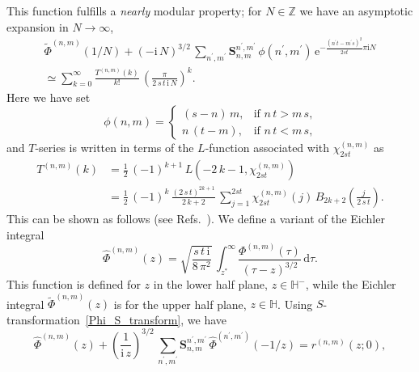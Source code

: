\documentclass[12pt,reqno]{amsart}
\begin{document}
This function  fulfills a \emph{nearly} modular property;
for $N \in \mathbb{Z}$ we have an asymptotic expansion in
$N\to \infty$,
\begin{multline}
  \label{nearly_modular_Phi}
  \widetilde{\Phi}^{(n,m)}(1/N)
  + ( - \mathrm{i} \, N)^{3/2} \,
  \sum_{n^\prime , m^\prime}
  \mathbf{S}_{n,m}^{n^\prime , m^\prime} \,
  \phi(n^\prime , m^\prime) \,
  \mathrm{e}^{
    - \frac{(n^\prime t - m^\prime s)^2}{2 s t} \pi \mathrm{i} N
  }
  \\
  \simeq
  \sum_{k=0}^\infty
  \frac{T^{(n,m)}(k)}{k!} \,
  \left(
    \frac{\pi}{2 \, s \, t \, \mathrm{i} \, N}
  \right)^k .
\end{multline}
Here we have set
\begin{equation}
  \phi(n,m)
  =
  \begin{cases}
    (s-n) \, m ,
    &
    \text{if  $n \,t > m \, s$,}
    \\[2mm]
%
    n \, (t-m) ,
    &
    \text{if  $n \, t < m \, s$,}
  \end{cases}
\end{equation}
and  $T$-series is written in terms of the $L$-function associated
with $\chi_{2 s t}^{(n,m)}$ as
\begin{align}
  T^{(n,m)}(k)
  & =
  \frac{1}{2} \, (-1)^{k+1} \, L(-2 \, k -1 , \chi_{2 s t}^{(n,m)})
  \nonumber \\
  & =
  \frac{1}{2} \, (-1)^k \, \frac{(2 \, s \, t)^{2 k+1}}{2 \, k +2} \,
  \sum_{j=1}^{2 s t}
  \chi_{2 s t}^{(n,m)}(j) \,
  B_{2 k +2} \left( \frac{j}{2 \, s \, t} \right) .
\end{align}
This can be
shown as follows
(see Refs.~).
We define a variant of the Eichler integral
\begin{equation}
  \label{variant_Eichler}
  \widehat{\Phi}^{(n,m)}(z)
  =
  \sqrt{\frac{s \, t \, \mathrm{i}}{8 \, \pi^2}}
  \,
  \int_{z^*}^\infty
  \frac{
    \Phi^{(n,m)}(\tau)
  }{
    (\tau - z)^{3/2}
  } \,
  \mathrm{d} \tau .
\end{equation}
This
function is defined for $z$ in the lower half plane,
$z \in \mathbb{H}^-$,
while  the Eichler integral $\widetilde{\Phi}^{(n,m)}(z)$ is for the
upper half plane, $z \in \mathbb{H}$.
Using $S$-transformation~\eqref{Phi_S_transform}, we have
\begin{equation}
  \label{Eichler_S_transform}
  \widehat{\Phi}^{(n,m)}(z)
  +
  \left(
    \frac{1}{\mathrm{i} \, z}
  \right)^{3/2} \,
  \sum_{n^\prime , m^\prime} \mathbf{S}_{n,m}^{n^\prime , m^\prime} \,
  \widehat{\Phi}^{(n^\prime , m^\prime)}(-1/z)
  =
  r^{(n,m)}(z; 0),
\end{equation}
\end{document}

